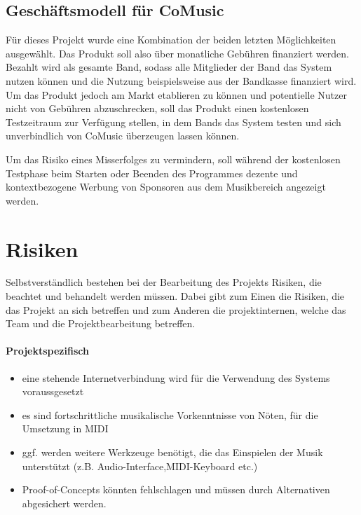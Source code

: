 \documentclass[12pt]{scrartcl}
\begin{document}
\subsection{Geschäftsmodell für CoMusic}

Für dieses Projekt wurde eine Kombination der beiden letzten Möglichkeiten ausgewählt. Das Produkt soll also über monatliche Gebühren finanziert werden. Bezahlt wird als gesamte Band, sodass alle Mitglieder der Band das System nutzen können und die Nutzung beispielsweise aus der Bandkasse finanziert wird. Um das Produkt jedoch am Markt etablieren zu können und potentielle Nutzer nicht von Gebühren abzuschrecken, soll das Produkt einen kostenlosen Testzeitraum zur Verfügung stellen, in dem Bands das System testen und sich unverbindlich von CoMusic überzeugen lassen können.

Um das Risiko eines Misserfolges zu vermindern, soll während der kostenlosen Testphase beim Starten oder Beenden des Programmes dezente und kontextbezogene Werbung von Sponsoren aus dem Musikbereich angezeigt werden.





\section{Risiken}



Selbstverständlich bestehen bei der Bearbeitung des Projekts Risiken, die beachtet und behandelt werden müssen. Dabei gibt zum Einen die Risiken, die das Projekt an sich betreffen und zum Anderen die projektinternen, welche das Team und die Projektbearbeitung betreffen.

\paragraph{Projektspezifisch}
\begin{itemize}
\item eine stehende Internetverbindung wird für die Verwendung des Systems voraussgesetzt
\item es sind fortschrittliche musikalische Vorkenntnisse von Nöten, für die Umsetzung in MIDI
\item ggf. werden weitere Werkzeuge benötigt, die das Einspielen der Musik unterstützt (z.B. Audio-Interface,MIDI-Keyboard etc.)
\item Proof-of-Concepts könnten fehlschlagen und müssen durch Alternativen abgesichert werden.
\end{itemize}
\end{document}
